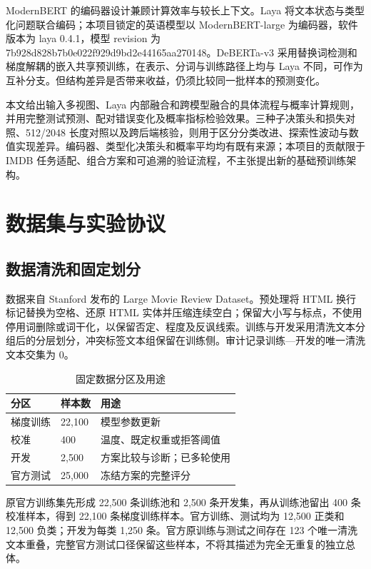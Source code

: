 \documentclass[UTF8,fontset=fandol,a4paper,11pt]{ctexart}
\begin{document}
ModernBERT 的编码器设计兼顾计算效率与较长上下文\cite{modernbert}。Laya 将文本状态与类型化问题联合编码\cite{laya}；本项目锁定的英语模型以 ModernBERT-large 为编码器，软件版本为 laya 0.4.1，模型 revision 为 7b928d828b7b0e022f929d9bd2e44165aa270148。DeBERTa-v3 采用替换词检测和梯度解耦的嵌入共享预训练\cite{deberta}，在表示、分词与训练路径上均与 Laya 不同，可作为互补分支。但结构差异是否带来收益，仍须比较同一批样本的预测变化。

本文给出输入多视图、Laya 内部融合和跨模型融合的具体流程与概率计算规则，并用完整测试预测、配对错误变化及概率指标检验效果。三种子决策头和损失对照、512/2048 长度对照以及跨后端核验，则用于区分分类改进、探索性波动与数值实现差异。编码器、类型化决策头和概率平均均有既有来源；本项目的贡献限于 IMDB 任务适配、组合方案和可追溯的验证流程，不主张提出新的基础预训练架构。

\section{数据集与实验协议}
\subsection{数据清洗和固定划分}
数据来自 Stanford 发布的 Large Movie Review Dataset\cite{maas}。预处理将 HTML 换行标记替换为空格、还原 HTML 实体并压缩连续空白；保留大小写与标点，不使用停用词删除或词干化，以保留否定、程度及反讽线索。训练与开发采用清洗文本分组后的分层划分，冲突标签文本组保留在训练侧。审计记录训练—开发的唯一清洗文本交集为 0。

\begin{table}[htbp]\centering\caption{固定数据分区及用途}\label{tab:t1}\small\renewcommand{\arraystretch}{1.25}
\begin{tabularx}{\linewidth}{YYY}\toprule
\textbf{分区} & \textbf{样本数} & \textbf{用途}\\\midrule
梯度训练 & 22,100 & 模型参数更新\\
校准 & 400 & 温度、既定权重或拒答阈值\\
开发 & 2,500 & 方案比较与诊断；已多轮使用\\
官方测试 & 25,000 & 冻结方案的完整评分\\
\bottomrule\end{tabularx}\end{table}
原官方训练集先形成 22,500 条训练池和 2,500 条开发集，再从训练池留出 400 条校准样本，得到 22,100 条梯度训练样本。官方训练、测试均为 12,500 正类和 12,500 负类；开发为每类 1,250 条。官方原训练与测试之间存在 123 个唯一清洗文本重叠，完整官方测试口径保留这些样本，不将其描述为完全无重复的独立总体。
\end{document}
